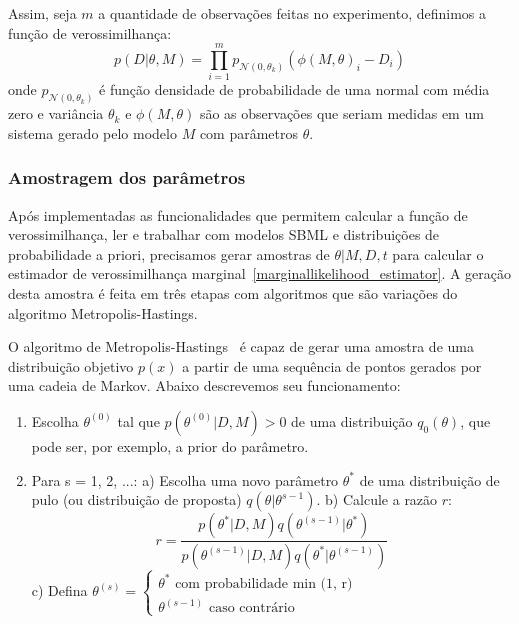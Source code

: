 \documentclass[12pt]{article}
\begin{document}
Assim, seja $m$ a quantidade de observações feitas no experimento, 
definimos a função de verossimilhança:
\begin{equation}\label{likelihood}
    p (D | \theta, M) = \prod_{i = 1}^m p_{\mathcal{N} (0, \theta_k)} (\phi (M, \theta)_i - D_i)
\end{equation}
onde $p_{\mathcal{N} (0, \theta_k)}$ é função densidade de probabilidade
de uma normal com média zero e variância $\theta_k$ e $\phi (M, \theta)$
são as observações que seriam medidas em um sistema gerado pelo modelo 
$M$ com parâmetros $\theta$.

\subsubsection{Amostragem dos parâmetros}
Após implementadas as funcionalidades que permitem calcular a função
de verossimilhança, ler e trabalhar com modelos SBML e distribuições de 
probabilidade a priori, precisamos gerar amostras de $\theta | M, D, t$
para calcular o estimador de verossimilhança 
marginal~\ref{marginallikelihood_estimator}. A geração desta amostra é
feita em três etapas com algoritmos que são variações do algoritmo 
Metropolis-Hastings.

O algoritmo de Metropolis-Hastings~\cite{BayesianDataAnalysis} é capaz 
de gerar uma amostra de uma distribuição objetivo $p (x)$ a partir de 
uma sequência de pontos gerados por uma cadeia de Markov. Abaixo 
descrevemos seu funcionamento:
\begin{enumerate}
    \item Escolha $\theta^{(0)}$ tal que $p(\theta^{(0)} | D, M) > 0$ de 
        uma distribuição $q_0(\theta)$, que pode ser, por exemplo, a
        prior do parâmetro.
    \item Para s = 1, 2, ...:
        \subitem a) Escolha uma novo parâmetro $\theta^*$ de uma 
        distribuição de pulo (ou distribuição de proposta) 
        $q (\theta | \theta^{s - 1})$.
        \subitem b) Calcule a razão $r$:
        \begin{equation}
            r = \frac{p(\theta^*| D, M) q(\theta^{(s - 1)} | \theta^*)}
                     {p(\theta^{(s - 1)} | D, M) q(\theta^* | \theta^{(s - 1)})}
        \end{equation}
        \subitem c) Defina $\theta^{(s)} = 
            \begin{cases}
                \theta^* \text{ com probabilidade min (1, r)}\\
                \theta^{(s - 1)} \text{ caso contrário}
            \end{cases}$
\end{enumerate}
\end{document}
